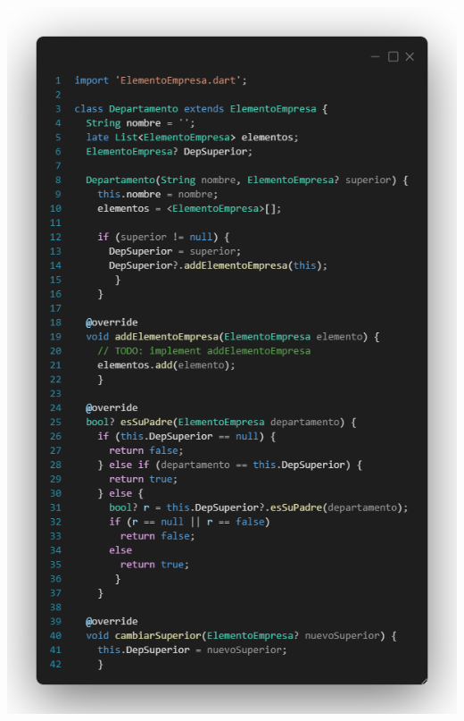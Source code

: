 \documentclass[
]{article}
\begin{document}
\includegraphics[width=5.90522in,height=9.26389in]{imagenes/Departamento1.png}
\end{document}
